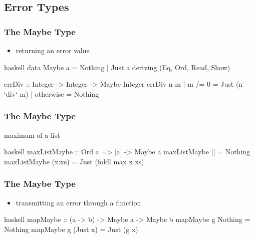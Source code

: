 \documentclass[dvipsnames]{beamer}
\theoremstyle{plain}
\begin{document}
\subsection{Error Types}

\begin{frame}[fragile]
  \frametitle{The Maybe Type}

  \begin{itemize}
    \item returning an error value
  \end{itemize}

  \begin{exampleblock}{}
    \begin{pygments}{haskell}
data Maybe a = Nothing | Just a
               deriving (Eq, Ord, Read, Show)


errDiv :: Integer -> Integer -> Maybe Integer
errDiv n m
  | m /= 0    = Just (n `div` m)
  | otherwise = Nothing
    \end{pygments}
  \end{exampleblock}
\end{frame}

\begin{frame}[fragile]
  \frametitle{The Maybe Type}

  \begin{exampleblock}{maximum of a list}
    \begin{pygments}{haskell}
maxListMaybe :: Ord a => [a] -> Maybe a
maxListMaybe []     = Nothing
maxListMaybe (x:xs) = Just (foldl max x xs)
    \end{pygments}
  \end{exampleblock}
\end{frame}

\begin{frame}[fragile]
  \frametitle{The Maybe Type}

  \begin{itemize}
    \item transmitting an error through a function
  \end{itemize}

  \begin{exampleblock}{}
    \begin{pygments}{haskell}
mapMaybe :: (a -> b) -> Maybe a -> Maybe b
mapMaybe g Nothing  = Nothing
mapMaybe g (Just x) = Just (g x)
    \end{pygments}
  \end{exampleblock}
\end{frame}
\end{document}
